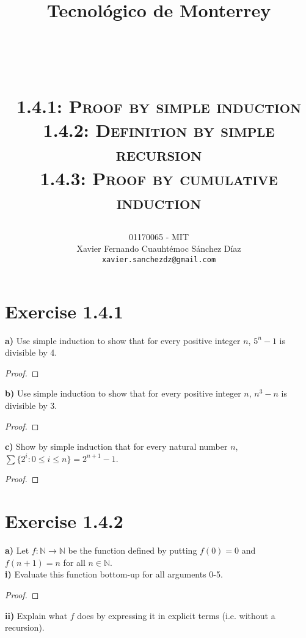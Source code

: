\documentclass[titlepage, letterpaper, fleqn]{article}
\title{
\vspace{1in}
\textbf{Tecnológico de Monterrey} \\
\vspace{0.5in}
\textmd{\mahclass} \\
\large{\textit{\mahteacher}} \\
\vspace{0.5in}
\textsc{\mahtitle}\\
\textsc{1.4.1: Proof by simple induction}\\
\textsc{1.4.2: Definition by simple recursion}\\
\textsc{1.4.3: Proof by cumulative induction}\\
\author{01170065  - MIT \\
Xavier Fernando Cuauhtémoc Sánchez Díaz \\
\texttt{xavier.sanchezdz@gmail.com}}
\date{\mahdate}
}
\newcommand{\spacepls}{\vspace{5mm}}
\begin{document}
\begin{titlepage}
\maketitle
\end{titlepage}

%
%

\section{Exercise 1.4.1}

{\large \textbf{a)} Use simple induction to show that for every positive integer \(n\), \(5^n - 1\) is divisible by 4.}

\begin{proof}
\lipsum[1]
\end{proof}

\spacepls

{\large \textbf{b)} Use simple induction to show that for every positive integer \(n\), \(n^3 - n\) is divisible by 3.}

\begin{proof}
\lipsum[1]
\end{proof}

\spacepls

{\large \textbf{c)} Show by simple induction that for every natural number \(n\), \(\sum \{2^i \colon 0 \leq i \leq n\} = 2^{n+1} - 1\).}

\begin{proof}
\lipsum[1]
\end{proof}

\section{Exercise 1.4.2}

{\large \textbf{a)} Let \(f \colon \mathbb{N} \to \mathbb{N}\) be the function defined by putting \(f(0) = 0\) and \(f(n+1) = n\) for all \(n \in \mathbb{N}\).}\\
\textbf{i)} Evaluate this function bottom-up for all arguments 0-5.

\begin{proof}
\lipsum[1]
\end{proof}

\spacepls

\textbf{ii)} Explain what \(f\) does by expressing it in explicit terms (i.e. without a recursion).
\end{document}
